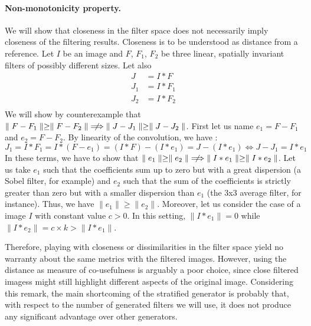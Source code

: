 \documentclass[a4paper]{report}
\begin{document}
			\paragraph{Non-monotonicity property.}
			We will show that closeness in the filter space does not necessarily imply closeness of the filtering results. Closeness is to be understood as distance from a reference.
			Let $I$ be an image and $F$, $F_1$, $F_2$ be three linear, spatially invariant filters of possibly different sizes. Let also
			\begin{align*}
				J &= I * F \\
				J_1 &= I * F_1 \\
				J_2 &= I * F_2 \\
			\end{align*}
			We will show by counterexample that $\parallel F - F_1 \parallel \geq \parallel F - F_2 \parallel \centernot\implies \parallel J - J_1 \parallel \geq \parallel J - J_2 \parallel$.
			First let us name $e_1 = F - F_1$ and $e_2 = F - F_2$. By linearity of the convolution, we have :
			\[
				J_1 = I * F_1 =  I * (F - e_1) = (I * F) - (I * e_1) = J - (I * e_1)
				\iff
				J - J_1 = I * e_1
			\]
			In these terms, we have to show that $\parallel e_1 \parallel \geq \parallel e_2 \parallel \centernot\implies \parallel I * e_1 \parallel \geq \parallel I * e_2 \parallel$. 
			Let us take $e_1$ such that the coefficients sum up to zero but with a great dispersion (a Sobel filter, for example) and $e_2$ such that the sum of the coefficients is strictly greater than zero but with a smaller dispersion than $e_1$ (the 3x3 average filter, for instance). Thus, we have  $\parallel e_1 \parallel \geq \parallel e_2 \parallel$. Moreover, let us consider the case of a image $I$ with constant value $c > 0$. In this setting, $\parallel I * e_1 \parallel = 0$ while $\parallel I * e_2 \parallel = c \times k > \parallel I * e_1 \parallel$.
			\par
			Therefore, playing with closeness or dissimilarities in the filter space yield no warranty about the same metrics with the filtered images. However, using the distance as measure of co-usefulness is arguably a poor choice, since close filtered imagess might still highlight different aspects of the original image. Considering this remark, the main shortcoming of the stratified generator is probably that, with respect to the number of generated filters we will use, it  does not produce any significant advantage over other generators.
			
			
\end{document}
